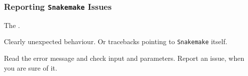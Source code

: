 \begin{frame}
  \frametitle{Reporting \texttt{Snakemake} Issues}
  \begin{question}[Where?]
  	 The .
  \end{question}	
  \pause
  \begin{question}[What?]
  	Clearly unexpected behaviour. Or tracebacks pointing to \texttt{Snakemake} itself. 
  \end{question}
  \pause
  \begin{question}[How?]
  	Read the error message and check input and parameters. Report an issue, when you are sure of it.
  \end{question}
\end{frame}

